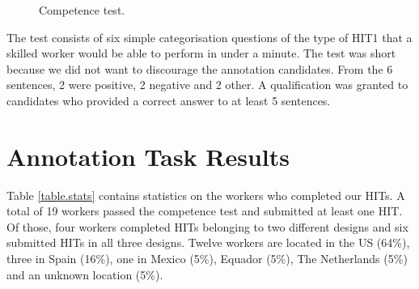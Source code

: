 \documentclass[11pt, a4paper,onecolumn]{article}
\begin{document}
\begin{figure}[h]
  \begin{center}
	\caption{Competence test.}
	\label{comtest}
  \end{center}
\end{figure}


The test consists of six simple categorisation questions of the type of HIT1 that a skilled worker would be able to perform in under a minute. The test was short because we did not want to discourage the annotation candidates. From the 6 sentences, 2 were positive, 2 negative and 2 other. A qualification was granted to candidates who provided a correct answer to at least 5 sentences.


\section{Annotation Task Results}
\label{sect:results}


Table \ref{table.stats} contains statistics on the workers who completed our HITs. A total of 19 workers passed the competence test and submitted at least one HIT. Of those, four workers completed HITs belonging to two different designs and six submitted HITs in all three designs. Twelve workers are located in the US (64\%), three in Spain (16\%), one in Mexico (5\%), Equador (5\%), The Netherlands (5\%) and an unknown location (5\%).
\end{document}
